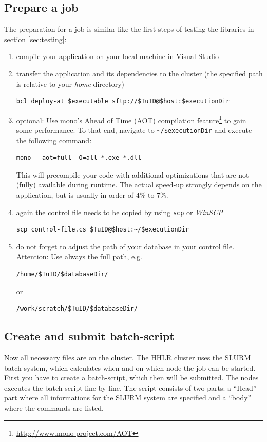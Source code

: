 \documentclass[11pt,twoside,a4paper]{fdyartcl}
\begin{document}
\subsection{Prepare a job}
The preparation for a job is similar like the first steps of testing the libraries in section \ref{sec:testing}:
\begin{enumerate}
\item compile your application on your local machine in Visual Studio
\item transfer the application and its dependencies to the cluster (the specified path is relative to your \emph{home} directory)
\begin{verbatim}
bcl deploy-at $executable sftp://$TuID@$host:$executionDir
\end{verbatim}
\item optional: Use mono's Ahead of Time (AOT) compilation feature\footnote{\url{http://www.mono-project.com/AOT}} to gain some performance. To that end, navigate to \verb|~/$executionDir| and execute the following command:
\begin{verbatim}
mono --aot=full -O=all *.exe *.dll
\end{verbatim}
This will precompile your code with additional optimizations that are not (fully) available during runtime. The actual speed-up strongly depends on the application, but is usually in order of 4\% to 7\%.
\item again the control file needs to be copied by using \verb|scp| or \emph{WinSCP}
\begin{verbatim}
scp control-file.cs $TuID@$host:~/$executionDir
\end{verbatim}
\item do not forget to adjust the path of your database in your control file. Attention: Use always the full path, e.g.
\begin{verbatim}
/home/$TuID/$databaseDir/
\end{verbatim}
or
\begin{verbatim}
/work/scratch/$TuID/$databaseDir/
\end{verbatim}
\end{enumerate}
\subsection{Create and submit batch-script}
Now all necessary files are on the cluster. The HHLR cluster uses the SLURM batch system, which calculates when and on which node the job can be started. First you have to create a batch-script, which then will be submitted. The nodes executes the batch-script line by line. The script consists of two parts: a ``Head'' part where all informations for the SLURM system are specified and a ``body'' where the commands are listed.\\
\end{document}
